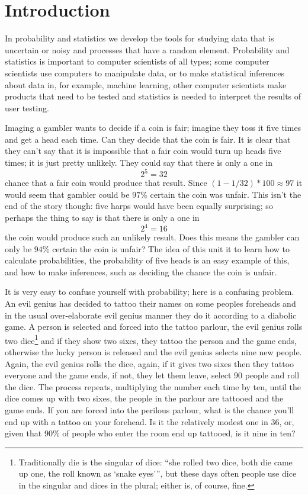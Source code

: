 \documentclass[11pt,a4paper]{scrartcl}
\begin{document}
\section*{Introduction}

In probability and statistics we develop the tools for studying data
that is uncertain or noisy and processes that have a random
element. Probability and statistics is important to computer
scientists of all types; some computer scientists use computers to
manipulate data, or to make statistical inferences about data in, for
example, machine learning, other computer scientists make products
that need to be tested and statistics is needed to interpret the
results of user testing.

Imaging a gambler wants to decide if a coin is fair; imagine they toss
it five times and get a head each time. Can they decide that the coin is
fair. It is clear that they can't say that it is
impossible that a fair coin would turn up heads five times; it is just
pretty unlikely. They could say that there is only a one in
\begin{equation}
2^{5}=32
\end{equation}
chance that a fair coin would produce that result. Since
$(1-1/32)*100\approx 97$ it would seem that gambler could be $97\%$
certain the coin was unfair. This isn't the end of the story though:
five harps would have been equally surprising; so perhaps the thing to
say is that there is only a one in
\begin{equation}
2^{4}=16
\end{equation}
the coin would produce such an unlikely result. Does this means the
gambler can only be $94\%$ certain the coin is unfair? The idea of
this unit it to learn how to calculate probabilities, the probability
of five heads is an easy example of this, and how to make inferences,
such as deciding the chance the coin is unfair.

It is very easy to confuse yourself with probability; here is a
confusing problem. An evil genius has decided to tattoo their names on
some peoples foreheads and in the usual over-elaborate evil genius
manner they do it according to a diabolic game. A person is selected
and forced into the tattoo parlour, the evil genius rolls two
dice\footnote{Traditionally die is the singular of
  dice: ``she rolled two dice, both die came up one, the roll known as
  `snake eyes''', but these days often people use dice in the singular
  and dices in the plural; either is, of course, fine.} and
if they show two sixes, they tattoo the person and the game ends,
otherwise the lucky person is released and the evil genius selects
nine new people. Again, the evil genius rolls the dice, again, if it
gives two sixes then they tattoo everyone and the game ends, if not,
they let them leave, select 90 people and roll the dice. The process
repeats, multiplying the number each time by ten, until the dice comes
up with two sixes, the people in the parlour are tattooed and the game
ends. If you are forced into the perilous parlour, what is the chance you'll
end up with a tattoo on your forehead. Is it the relatively modest one
in 36, or, given that 90\% of people who enter the room end up
tattooed, is it nine in ten?
\end{document}
